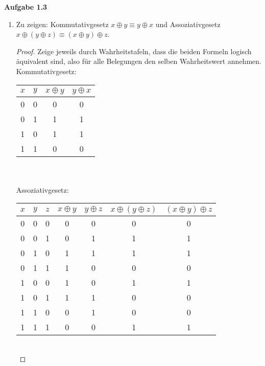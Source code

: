 \documentclass[a4paper,10pt]{article}
\begin{document}
\noindent\textbf{Aufgabe 1.3}\\
\begin{enumerate}
\item Zu zeigen: Kommutativgesetz $x \oplus y \equiv y \oplus x$ und Assoziativgesetz $x \oplus (y \oplus z) \equiv (x \oplus y) \oplus z$. 
\begin{proof} Zeige jeweils durch Wahrheitstafeln, dass die beiden Formeln logisch äquivalent sind, also für alle Belegungen den selben Wahrheitswert annehmen. \\
Kommutativgesetz: \\
\begin{tabular}{|c|c|c|c|}
\hline 
\rule[-1ex]{0pt}{2.5ex} $x$ & $y$ & $x \oplus y$ & $y \oplus x$ \\ 
\hline 
\rule[-1ex]{0pt}{2.5ex} 0 & 0 & 0 & 0 \\ 
\hline 
\rule[-1ex]{0pt}{2.5ex} 0 & 1 & 1 & 1 \\ 
\hline 
\rule[-1ex]{0pt}{2.5ex} 1 & 0 & 1 & 1 \\ 
\hline 
\rule[-1ex]{0pt}{2.5ex} 1 & 1 & 0 & 0 \\ 
\hline 
\end{tabular} \\ \\
Assoziativgesetz: \\
\begin{tabular}{|c|c|c|c|c|c|c|}
\hline 
\rule[-1ex]{0pt}{2.5ex} $x$ & $y$ & $z$ & $x \oplus y$ & $y \oplus z$ & $x \oplus (y \oplus z)$ & $(x \oplus y) \oplus z$ \\ 
\hline 
\rule[-1ex]{0pt}{2.5ex} 0 & 0 & 0 & 0 & 0 & 0 & 0 \\ 
\hline 
\rule[-1ex]{0pt}{2.5ex} 0 & 0 & 1 & 0 & 1 & 1 & 1 \\ 
\hline 
\rule[-1ex]{0pt}{2.5ex} 0 & 1 & 0 & 1 & 1 & 1 & 1 \\ 
\hline 
\rule[-1ex]{0pt}{2.5ex} 0 & 1 & 1 & 1 & 0 & 0 & 0 \\ 
\hline 
\rule[-1ex]{0pt}{2.5ex} 1 & 0 & 0 & 1 & 0 & 1 & 1 \\ 
\hline 
\rule[-1ex]{0pt}{2.5ex} 1 & 0 & 1 & 1 & 1 & 0 & 0 \\ 
\hline 
\rule[-1ex]{0pt}{2.5ex} 1 & 1 & 0 & 0 & 1 & 0 & 0 \\ 
\hline 
\rule[-1ex]{0pt}{2.5ex} 1 & 1 & 1 & 0 & 0 & 1 & 1 \\ 
\hline
\end{tabular} \\
\end{proof}


\end{enumerate}
\end{document}
